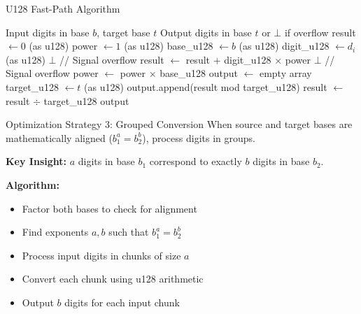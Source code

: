 \documentclass[10pt]{beamer}
\begin{document}
\begin{frame}[fragile]{U128 Fast-Path Algorithm}
\begin{algorithm}[H]
\caption{U128 Fast-Path Conversion}
\begin{algorithmic}[1]
\scriptsize
\REQUIRE Input digits in base $b$, target base $t$ \ENSURE Output digits in base $t$ or $\bot$ if overflow
\STATE result $\gets 0$ (as u128)
\STATE power $\gets 1$ (as u128)
\STATE base\_u128 $\gets b$ (as u128)
  \STATE digit\_u128 $\gets d_i$ (as u128)
    \RETURN $\bot$ // Signal overflow
  \ENDIF
  \STATE result $\gets$ result $+$ digit\_u128 $\times$ power
    \RETURN $\bot$ // Signal overflow
  \ENDIF
  \STATE power $\gets$ power $\times$ base\_u128
\ENDFOR
\STATE output $\gets$ empty array
\STATE target\_u128 $\gets t$ (as u128)
  \STATE output.append(result mod target\_u128)
  \STATE result $\gets$ result $\div$ target\_u128
\ENDWHILE
\RETURN output
\end{algorithmic}
\end{algorithm}
\end{frame}

\begin{frame}{Optimization Strategy 3: Grouped Conversion}
When source and target bases are mathematically aligned ($b_1^a = b_2^b$), process digits in groups.

\vspace{0.3cm}
\textbf{Key Insight:} $a$ digits in base $b_1$ correspond to exactly $b$ digits in base $b_2$.

\vspace{0.3cm}
\textbf{Algorithm:}
\begin{itemize}
\item Factor both bases to check for alignment
\item Find exponents $a, b$ such that $b_1^a = b_2^b$ \item Process input digits in chunks of size $a$ \item Convert each chunk using u128 arithmetic
\item Output $b$ digits for each input chunk
\end{itemize}
\end{frame}
\end{document}
